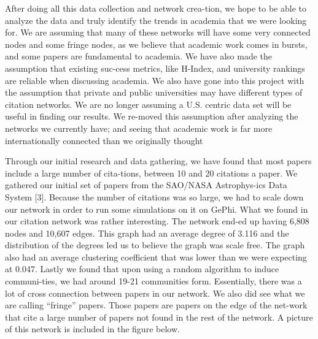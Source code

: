 \documentclass[times, 10pt,twocolumn]{article}
\begin{document}
After doing all this data collection and network crea-tion, we hope to be able to analyze the data and truly identify the trends in academia that we were looking for. We are assuming that many of these networks will have some very connected nodes and some fringe nodes, as we believe that academic work comes in bursts, and some papers are fundamental to academia. We have also made the assumption that existing suc-cess metrics, like H-Index, and university rankings are reliable when discussing academia. We also have gone into this project with the assumption that private and public universities may have different types of citation networks. We are no longer assuming a U.S. centric data set will be useful in finding our results. We re-moved this assumption  after analyzing the networks we currently have; and seeing that academic work is far more internationally connected than we originally thought



Through our initial research and data gathering, we have found that most papers include a large number of cita-tions, between 10 and 20 citations a paper. We gathered our initial set of papers from the SAO/NASA Astrophys-ics Data System [3]. Because the number of citations was so large, we had to scale down our network in order to run some simulations on it on GePhi. What we found in our citation network was rather interesting. The network end-ed up having 6,808 nodes and 10,607 edges. This graph had an average degree of 3.116 and the distribution of the degrees led us to believe the graph was scale free. The graph also had an average clustering coefficient that was lower than we were expecting at 0.047. Lastly we found that upon using a random algorithm to induce communi-ties, we had around 19-21 communities form. Essentially, there was a lot of cross connection between papers in our network. We also did see what we are calling “fringe” papers. Those papers are papers on the edge of the net-work that cite a large number of papers not found in the rest of the network. A picture of this network is included in the figure below.
\end{document}
